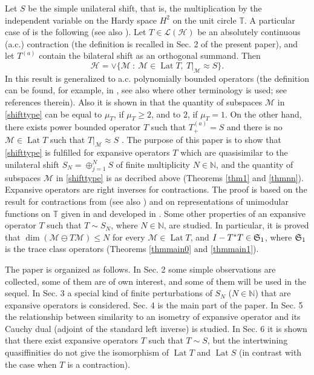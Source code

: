 \documentclass[a4paper,oneside,11pt]{amsart}
\numberwithin{equation}{section}
\theoremstyle{plain}
\theoremstyle{definition}
\begin{document}
Let $S$ be the simple unilateral shift, 
that is, the multiplication by the independent variable on the Hardy space $H^2$ on the unit circle $\mathbb T$. 
A particular case of \cite{ker07} is the following (see also {\cite[Sec. IX.3]{nfbk}}). 
 Let $T\in\mathcal L(\mathcal H)$ be an absolutely continuous  (a.c.) contraction (the definition is recalled in Sec. 2 of the present paper), 
and let $T^{(a)}$ contain the bilateral shift as an orthogonal summand.
Then 
\begin{equation}\label{shifttype}\mathcal H=\vee\{\mathcal M \ : \ \mathcal M\in\operatorname{Lat}T,\  T|_{\mathcal M} \approx S\}. 
\end{equation}
In \cite{gamal22} this result is generalized  to a.c. polynomially bounded operators (the definition  
can be found, for example, in {\cite[Ch. 15]{peller}}, see also {\cite[Ch. I.13]{nfbk}} where other terminology is used; see references therein). 
Also it is shown in \cite{gamal22} that the quantity of subspaces $\mathcal M$ in \eqref{shifttype} can be equal to $\mu_T$, 
if $\mu_T\geq 2$, and to $2$, if $\mu_T=1$. On the other hand, there exists  power bounded operator $T$ such that  $T^{(a)}_+=S$ and 
there is no $\mathcal M\in\operatorname{Lat}T$ such that $T|_{\mathcal M} \approx S$ {\cite[Sec. 5]{gamal16}}.  
The purpose of this paper is  to show that \eqref{shifttype} is fulfilled for expansive operators $T$ which are quasisimilar 
to the unilateral shift $S_N=\oplus_{j=1}^N S$ of finite multiplicity $N\in\mathbb N$, and  
the quantity of subspaces $\mathcal M$ in \eqref{shifttype} is as decribed above (Theorems \ref{thm1} and \ref{thmnn}). Expansive operators are right inverses for contractions. 
The proof is based on the result for contractions from \cite{ker07} (see also {\cite[Sec. IX.3]{nfbk}})  and 
on representations of unimodular  functions on $\mathbb T$ given in \cite{bourgain} and developed in \cite{hjelle}. 
Some other properties 
 of an expansive operator $T$ such that $T\sim S_N$,  where $N\in\mathbb N$, are studied. In particular, it is proved that 
$\dim(\mathcal M\ominus T\mathcal M)\leq N$ for every $\mathcal M\in \operatorname{Lat}T$, and 
$I-T^*T\in \frak S_1$, where
 $\frak S_1$ is the trace class operators (Theorems \ref{thmmain0} and \ref{thmmain1}).  

The paper is organized as follows. In Sec. 2 some simple observations are collected, some of them are of own interest, and some of them will be used in the sequel. In Sec. 3 a special kind of finite perturbations of $S_N$ ($N\in\mathbb N$) that are  expansive operators  is considered. Sec. 4 is the main part of the paper. In Sec. 5 the relationship between similarity to an isometry 
of expansive operator and its Cauchy dual (adjoint of the standard left inverse) is studied. In Sec.  6 it is shown that there exist expansive operators $T$ such that $T\sim S$, but 
the intertwining quasiffinities do not give the isomorphism of $\operatorname{Lat}T$ and $\operatorname{Lat}S$ 
(in contrast with the case when $T$ is a contraction).  
\end{document}
